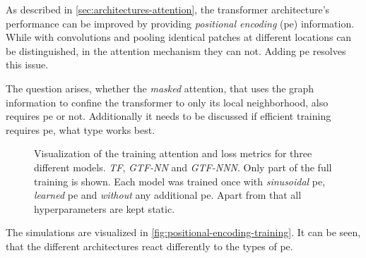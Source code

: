 As described in \autoref{sec:architectures-attention}, the transformer architecture's performance can be improved by providing  \emph{positional encoding} (pe) information.
While with convolutions and pooling identical patches at different locations can be distinguished, in the attention mechanism they can not.
Adding pe resolves this issue.

The question arises, whether the \emph{masked} attention, that uses the graph information to confine the transformer to only its local neighborhood, also requires pe or not. 
Additionally it needs to be discussed if efficient training requires pe, what type works best.

\begin{figure}[htbp]
    \centering
    \caption{Visualization of the training attention and loss metrics for three different models. \emph{TF}, \emph{GTF-NN} and \emph{GTF-NNN}.
    Only part of the full training is shown. 
    Each model was trained once with \emph{sinusoidal} pe, \emph{learned} pe and \emph{without} any additional pe.
    Apart from that all hyperparameters are kept static.
    }
    \label{fig:positional-encoding-training}
\end{figure}

The simulations are visualized in \autoref{fig:positional-encoding-training}.
It can be seen, that the different architectures react differently to the types of pe.

